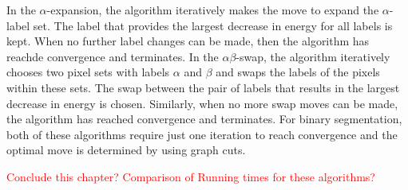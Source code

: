 In the $\alpha$-expansion, the algorithm iteratively makes the move to expand the $\alpha$-label set. The label that provides the largest decrease in energy for all labels is kept. When no further label changes can be made, then  the algorithm has reachde convergence and terminates.
In the $\alpha\beta$-swap, the algorithm iteratively chooses two pixel sets with labels $\alpha$ and $\beta$ and swaps the labels of the pixels within these sets. The swap between the pair of labels that results in the largest decrease in energy is chosen. Similarly, when no more swap moves can be made, the algorithm has reached convergence and terminates. For binary segmentation, both of these algorithms require just one iteration to reach convergence and the optimal move is determined by using graph cuts.

\textcolor{red}{Conclude this chapter? Comparison of Running times for these algorithms?}